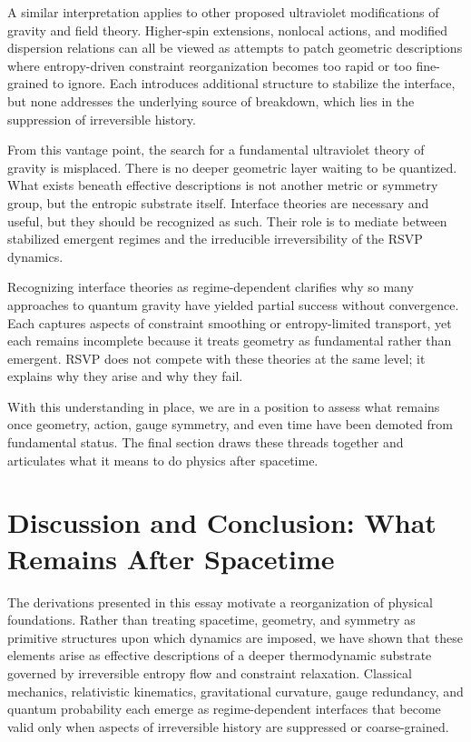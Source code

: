 \documentclass[11pt]{article}
\begin{document}
A similar interpretation applies to other proposed ultraviolet modifications of gravity and field theory. Higher-spin extensions, nonlocal actions, and modified dispersion relations can all be viewed as attempts to patch geometric descriptions where entropy-driven constraint reorganization becomes too rapid or too fine-grained to ignore. Each introduces additional structure to stabilize the interface, but none addresses the underlying source of breakdown, which lies in the suppression of irreversible history.

From this vantage point, the search for a fundamental ultraviolet theory of gravity is misplaced. There is no deeper geometric layer waiting to be quantized. What exists beneath effective descriptions is not another metric or symmetry group, but the entropic substrate itself. Interface theories are necessary and useful, but they should be recognized as such. Their role is to mediate between stabilized emergent regimes and the irreducible irreversibility of the RSVP dynamics.

Recognizing interface theories as regime-dependent clarifies why so many approaches to quantum gravity have yielded partial success without convergence. Each captures aspects of constraint smoothing or entropy-limited transport, yet each remains incomplete because it treats geometry as fundamental rather than emergent. RSVP does not compete with these theories at the same level; it explains why they arise and why they fail.

With this understanding in place, we are in a position to assess what remains once geometry, action, gauge symmetry, and even time have been demoted from fundamental status. The final section draws these threads together and articulates what it means to do physics after spacetime.

\section{Discussion and Conclusion: What Remains After Spacetime}

The derivations presented in this essay motivate a reorganization of physical foundations. Rather than treating spacetime, geometry, and symmetry as primitive structures upon which dynamics are imposed, we have shown that these elements arise as effective descriptions of a deeper thermodynamic substrate governed by irreversible entropy flow and constraint relaxation. Classical mechanics, relativistic kinematics, gravitational curvature, gauge redundancy, and quantum probability each emerge as regime-dependent interfaces that become valid only when aspects of irreversible history are suppressed or coarse-grained.
\end{document}

